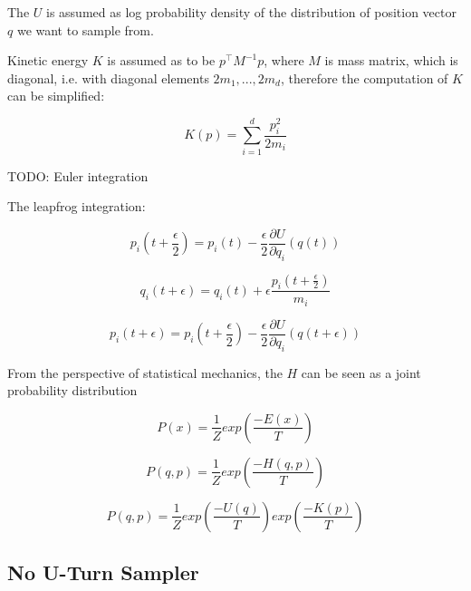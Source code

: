 \documentclass[
  digital, %
  oneside, %
  lof,     %
  lot,     %
]{fithesis4}
\begin{document}
The $U$ is assumed as log probability density of the distribution
of position vector $q$ we want to sample from.

Kinetic energy $K$ is assumed as to be $p^\intercal M^{-1} p$, 
where $M$ is mass matrix, which is diagonal, i.e. with
diagonal elements $2m_1, ..., 2m_d$, therefore the computation of $K$
can be simplified:

\begin{equation}
  K(p) = \sum_{i=1}^{d} \frac{p_i^2}{2 m_i}
\end{equation}

TODO: Euler integration

The leapfrog integration:

\begin{equation}
  p_i \left(t + \frac{\epsilon}{2} \right) = p_i(t) - \frac{\epsilon}{2} \frac{\partial U}{\partial q_i} (q(t))
\end{equation}

\begin{equation}
  q_i(t + \epsilon) = q_i(t) + \epsilon \frac{p_i \left(t + \frac{\epsilon}{2} \right)}{m_i}
\end{equation}

\begin{equation}
  p_i(t + \epsilon) = p_i \left( t + \frac{\epsilon}{2} \right) - \frac{\epsilon}{2} \frac{\partial U}{\partial q_i} \left( q \left( t + \epsilon \right) \right)
\end{equation}

From the perspective of statistical mechanics, the $H$ can be seen
as a joint probability distribution

\begin{equation}
  P(x) = \frac{1}{Z} exp \left( \frac{-E(x)}{T} \right)
\end{equation}

\begin{equation}
  P(q, p) = \frac{1}{Z} exp \left( \frac{-H(q, p)}{T} \right)
\end{equation}

\begin{equation}
  P(q, p) = \frac{1}{Z} exp \left( \frac{-U(q)}{T} \right) exp \left( \frac{-K(p)}{T} \right)
\end{equation}

\subsection{No U-Turn Sampler}
\end{document}
